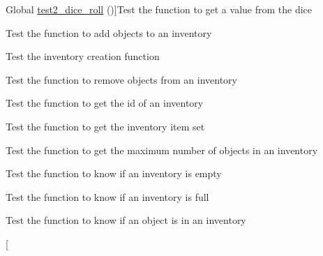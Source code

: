 \begin{DoxyRefList}
Global \hyperlink{dice__test_8c_a6c0509c7a5effe89212b9d786d9fc30c}{test2\+\_\+dice\+\_\+roll} ()]Test the function to get a value from the dice  
\item[\label{test__test000062}%
\Hypertarget{test__test000062}%
Global \hyperlink{inventory__test_8c_a48019cb45cb5918233d5d42334d2be17}{test2\+\_\+inventory\+\_\+add} ()]Test the function to add objects to an inventory  
\item[\label{test__test000058}%
\Hypertarget{test__test000058}%
Global \hyperlink{inventory__test_8c_a73a6080c360a8870c4ffc734e989c8b3}{test2\+\_\+inventory\+\_\+create} ()]Test the inventory creation function  
\item[\label{test__test000065}%
\Hypertarget{test__test000065}%
Global \hyperlink{inventory__test_8c_ac0175a02211c4bb5ecffbb9f0ebd1152}{test2\+\_\+inventory\+\_\+dell} ()]Test the function to remove objects from an inventory  
\item[\label{test__test000080}%
\Hypertarget{test__test000080}%
Global \hyperlink{inventory__test_8c_ae39f02e7d91f78fabb2faaa4c3b4f7a7}{test2\+\_\+inventory\+\_\+get\+\_\+id} ()]Test the function to get the id of an inventory  
\item[\label{test__test000060}%
\Hypertarget{test__test000060}%
Global \hyperlink{inventory__test_8c_aa90dc9b98c6d00cbb1fd8be85f9be762}{test2\+\_\+inventory\+\_\+get\+\_\+inside} ()]Test the function to get the inventory item set  
\item[\label{test__test000072}%
\Hypertarget{test__test000072}%
Global \hyperlink{inventory__test_8c_abddcab377edb21235d6746668597fde2}{test2\+\_\+inventory\+\_\+get\+\_\+max} ()]Test the function to get the maximum number of objects in an inventory  
\item[\label{test__test000077}%
\Hypertarget{test__test000077}%
Global \hyperlink{inventory__test_8c_a00a4e952d7b94aedfdac9bb07ec53b0a}{test2\+\_\+inventory\+\_\+is\+\_\+emty} ()]Test the function to know if an inventory is empty  
\item[\label{test__test000074}%
\Hypertarget{test__test000074}%
Global \hyperlink{inventory__test_8c_a1c9e567d4919d5aaccc9580815a8a81d}{test2\+\_\+inventory\+\_\+is\+\_\+full} ()]Test the function to know if an inventory is full  
\item[\label{test__test000068}%
\Hypertarget{test__test000068}%
Global \hyperlink{inventory__test_8c_a7dc6f9e65941e8cf9b6a983a0de7fc5a}{test2\+\_\+inventory\+\_\+is\+\_\+object} ()]Test the function to know if an object is in an inventory  
\item[\label{test__test000082}%

\end{DoxyRefList}
